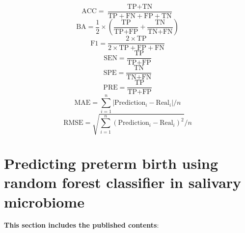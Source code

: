 \documentclass[11pt, a4paper, onecolumn, oneside]{report}
\begin{document}
        \begin{equation}
            \textrm{ACC} = \frac{\textrm{TP} + \textrm{TN}}{\textrm{TP} + \textrm{FN} + \textrm{FP} + \textrm{TN}}
            \label{eq:ACC}
        \end{equation}
        \begin{equation}
            \textrm{BA} = \frac{1}{2} \times (\frac{\textrm{TP}}{\textrm{TP} + \textrm{FP}} + \frac{\textrm{TN}}{\textrm{TN} + \textrm{FN}})
            \label{eq:BA}
        \end{equation}
        \begin{equation}
            \textrm{F1} = \frac{2 \times \textrm{TP}}{2 \times \textrm{TP} + \textrm{FP} + \textrm{FN}}
            \label{eq:F1}
        \end{equation}
        \begin{equation}
            \textrm{SEN} = \frac{\textrm{TP}}{\textrm{TP} + \textrm{FP}}
            \label{eq:SEN}
        \end{equation}
        \begin{equation}
            \textrm{SPE} = \frac{\textrm{TN}}{\textrm{TN} + \textrm{FN}}
            \label{eq:SPE}
        \end{equation}
        \begin{equation}
            \textrm{PRE} = \frac{\textrm{TP}}{\textrm{TP} + \textrm{FP}}
            \label{eq:PRE}
        \end{equation}
        \begin{equation}
            \textrm{MAE} = \sum_{i=1}^{n} |\textrm{Prediction}_i - \text{Real}_i| / n
            \label{eq:MAE}
        \end{equation}
        \begin{equation}
            \textrm{RMSE} = \sqrt{\sum_{i=1}^{n} (\textrm{Prediction}_i - \text{Real}_i) ^2} / n
            \label{eq:RMSE}
        \end{equation}
        \clearpage
    \newpage

    \section{Predicting preterm birth using random forest classifier in salivary microbiome}
        \label{section:PTB}

        \textbf{This section includes the published contents}: \\
         \nocite{PTB-JW-1}
\end{document}
